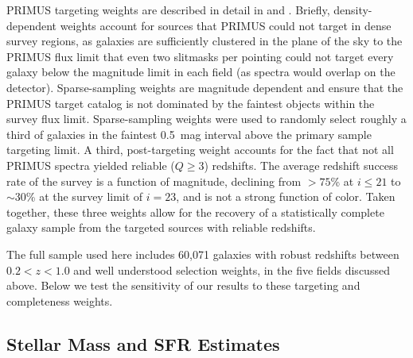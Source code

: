 PRIMUS targeting weights are described in detail in \citet{Coil11} and \citet{Cool13}.
Briefly, density-dependent weights account for sources that PRIMUS could not target in dense survey regions, as galaxies are sufficiently clustered in the 
plane of
the sky to the PRIMUS flux limit that even two slitmasks per pointing could not target every galaxy below the magnitude limit in each field (as spectra would overlap on the detector). 
Sparse-sampling weights are magnitude dependent and ensure that the PRIMUS target catalog is not dominated by the faintest objects within the survey flux limit. Sparse-sampling weights were used to randomly select roughly a third 
of galaxies in the faintest 0.5~mag interval above the primary sample 
targeting limit.
A third, post-targeting weight \citep[detailed in][]{Cool13} accounts for the fact that not all PRIMUS spectra yielded reliable {($Q \ge 3$)} redshifts.
The average redshift success rate of the survey is a function of magnitude, declining from $>75$\% at ${i\le21}$ to $\sim30$\% at the survey limit of $i=23$, and is not a strong function of color.  
Taken together, these three weights allow for the recovery of a statistically complete galaxy sample from the targeted sources with reliable redshifts.  

The full sample used here includes 60,071 galaxies with robust redshifts between $0.2<z<1.0$ and well understood selection weights, in the five fields discussed above.
Below we test the sensitivity of our results to these targeting and completeness weights.

\subsection{Stellar Mass and SFR Estimates}\label{sec:SFR}
 

